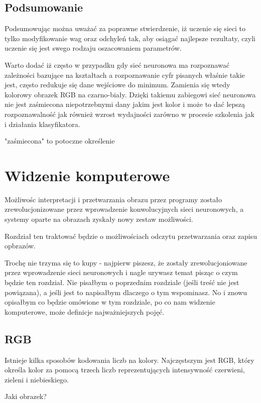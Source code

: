 \documentclass[brudnopis]{xmgr}
\begin{document}
 \section{Podsumowanie \label{s:dsssl}}
 
Podsumowując można uważać za  poprawne stwierdzenie, iż uczenie się sieci to tylko modyfikowanie wag oraz odchyleń tak, aby osiągać najlepsze rezultaty, czyli uczenie się jest swego rodzaju oszacowaniem parametrów.   

 Warto dodać iż często w przypadku gdy sieć neuronowa ma rozpoznawać zależności bazujące na kształtach a rozpoznawanie cyfr pisanych właśnie takie jest, często redukuje się dane wejściowe do minimum. Zamienia się wtedy kolorowy obrazek RGB na czarno-biały. Dzięki takiemu zabiegowi sieć neuronowa nie jest zaśmiecona niepotrzebnymi dany jakim jest kolor i może to dać lepszą rozpoznawalność jak również wzrost wydajności zarówno w procesie szkolenia jak i działania klasyfikatora.  
 
 "zaśmiecona" to potoczne określenie


\chapter{Widzenie komputerowe  }


Możliwośc interpretacji i przetwarzania obrazu przez programy zostało zrewolucjonizowane
przez wprowadzenie konwolucyjnych sieci neuronowych, a systemy oparte na obrazach zyskały nowy zestaw możliwości. 

Rozdział ten traktować będzie o możliwościach odczytu przetwarzania oraz zapisu opbrazów.

Trochę nie trzyma się to kupy - najpierw piszesz, że zostały zrewolucjoniowane przez wprowadzenie sieci neuronowych i nagle urywasz temat pisząc o czym będzie ten rozdział. Nie pisałbym o poprzednim rozdziale (jeśli treść nie jest powiązana), a jeśli jest to napisałbym dlaczego o tym wspominasz. No i znowu opisałbym co będzie omówione w tym rozdziale, po co nam widzenie komputerowe, może definicje najważniejszych pojęć.

 \section{RGB\label{s:dsssl}}
 Istnieje kilka sposobów kodowania liczb na kolory. Najczęstszym jest
RGB, który określa kolor za pomocą trzech liczb reprezentujących intensywność czerwieni, zieleni i niebieskiego. 

Jaki obrazek? 
\end{document}
